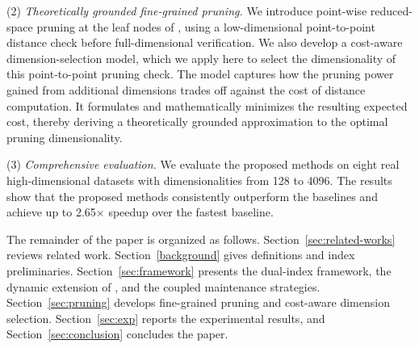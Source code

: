 \noindent(2) \emph{Theoretically grounded fine-grained pruning.}
We introduce point-wise reduced-space pruning at the leaf nodes of \dualtree, using a low-dimensional point-to-point distance check before full-dimensional verification. We also develop a cost-aware dimension-selection model, which we apply here to select the dimensionality of this point-to-point pruning check. The model captures how the pruning power gained from additional dimensions trades off against the cost of distance computation. It formulates and mathematically minimizes the resulting expected cost, thereby deriving a theoretically grounded approximation to the optimal pruning dimensionality.

\noindent(3) \emph{Comprehensive evaluation.}
We evaluate the proposed methods on eight real high-dimensional datasets with dimensionalities from 128 to 4096. The results show that the proposed methods consistently outperform the baselines and achieve up to 2.65$\times$ speedup over the fastest baseline.

The remainder of the paper is organized as follows. Section~\ref{sec:related-works} reviews related work. Section~\ref{background} gives definitions and index preliminaries. Section~\ref{sec:framework} presents the dual-index framework, the dynamic extension of \hdrtree, and the coupled maintenance strategies. Section~\ref{sec:pruning} develops fine-grained pruning and cost-aware dimension selection. Section~\ref{sec:exp} reports the experimental results, and Section~\ref{sec:conclusion} concludes the paper.
